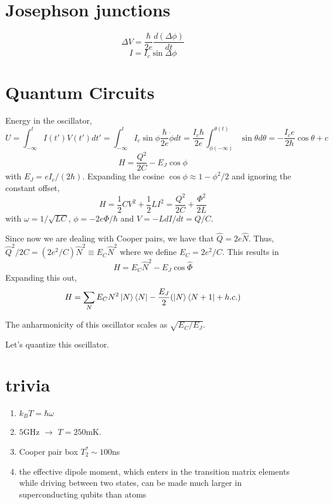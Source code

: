 \documentclass{article}
\begin{document}
\section{Josephson junctions}
\begin{equation}
    \Delta V = \frac{\hbar}{2e}\frac{d(\Delta \phi)}{dt}
\end{equation}
\begin{equation}
    I = I_c\sin{\Delta \phi}
\end{equation}
\section{Quantum Circuits}
Energy in the oscillator,
\begin{equation}
    U = \int_{-\infty}^t I(t')V(t')dt' = \int_{-\infty}^t I_c\sin\phi \frac{\hbar}{2e}\dot{\phi}dt = \frac{I_c \hbar}{2e}\int_{\phi(-\infty)}^{\theta(t)}\sin\theta d\theta = -\frac{I_ce}{2\hbar} \cos\theta + c
\end{equation}
\begin{equation}
    H = \frac{Q^2}{2C} - E_J\cos\phi 
\end{equation}
with $E_J = eI_c/(2\hbar)$. Expanding the cosine $\cos\phi \approx 1-\phi^2/2$ and ignoring the constant offset,
\begin{equation}
    H = \frac{1}{2}CV^2 + \frac{1}{2}LI^2 = \frac{Q^2}{2C} + \frac{\Phi^2}{2L}
\end{equation}
with $\omega = 1/\sqrt{LC}$, $\phi = -2e\Phi/\hbar$ and $V = -LdI/dt = Q/C$.


Since now we are dealing with Cooper pairs, we have that $\hat{Q} = 2e\hat{N}$. Thus, $\hat{Q}^2/2C = (2e^2/C)\hat{N}^2 \equiv E_C\hat{N}^2$ where we define $E_C=2e^2/C$. This results in
\begin{equation}
    \boxed{H = E_C\hat{N}^2 - E_J\cos\hat{\Phi}}
\end{equation}
Expanding this out,
\begin{equation}
    H = \sum_N E_CN^2\ket{N}\bra{N} -\frac{E_J}{2}(\ket{N}\bra{N+1} + h.c.)
\end{equation}



The anharmonicity of this oscillator scales as $\sqrt{E_C/E_J}$.

Let's quantize this oscillator.

\section{trivia}
\begin{enumerate}
\item $k_BT=\hbar\omega$
\item $5$GHz $\to$ $T = 250$mK.
\item Cooper pair box $T_2^*\sim 100$ns
\item the effective dipole moment, which enters in the transition matrix elements while driving between two states, can be made much larger in superconducting qubits than atoms
\end{enumerate}


\end{document}

